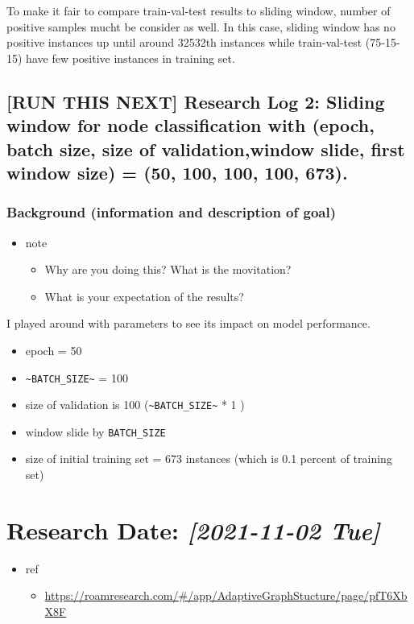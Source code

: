 \documentclass[11pt]{article}
\begin{document}
To make it fair to compare train-val-test results to sliding window, number of positive samples mucht be consider as well.
In this case, sliding window has no positive instances up until around 32532th instances while train-val-test (75-15-15) have few positive instances in training set.

\subsection{[RUN THIS NEXT] Research Log 2: Sliding window for node classification with (epoch, batch size, size of validation,window slide, first window size) = (50, 100, 100, 100, 673).}
\label{sec:org622b568}
\subsubsection{Background (information and description of goal)}
\label{sec:org77c2062}
\begin{itemize}
\item note
\begin{itemize}
\item Why are you doing this? What is the movitation?
\item What is your expectation of the results?
\end{itemize}
\end{itemize}

I played around with parameters to see its impact on model performance.

\begin{itemize}
\item epoch = 50
\item \texttt{\textasciitilde{}BATCH\_SIZE\textasciitilde{}} = 100
\item size of validation is 100 (\texttt{\textasciitilde{}BATCH\_SIZE\textasciitilde{}} * 1 )
\item window slide by \texttt{BATCH\_SIZE}
\item size of initial training set = 673 instances (which is 0.1 percent of training set)
\end{itemize}


\section{Research Date: \textit{[2021-11-02 Tue]}}
\label{sec:org4f70fa2}
\begin{itemize}
\item ref
\begin{itemize}
\item \url{https://roamresearch.com/\#/app/AdaptiveGraphStucture/page/pfT6XbX8F}
\end{itemize}
\end{itemize}
\end{document}
